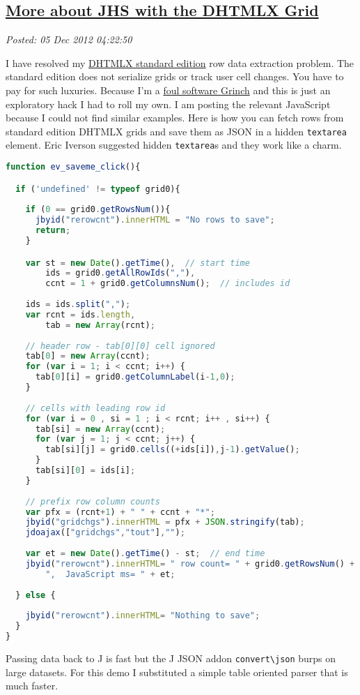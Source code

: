 %

\subsection*{\href{https://bakerjd99.wordpress.com/2012/12/04/more-about-jhs-with-dhtmlx-the-grid/}{More about JHS with the DHTMLX Grid}}


\noindent\emph{Posted: 05 Dec 2012 04:22:50}
\vspace{6pt}

I have resolved my \href{http://dhtmlx.com/docs/download.shtml}{DHTMLX
standard edition} row data extraction problem. The standard edition does
not serialize grids or track user cell changes. You have to pay for such
luxuries. Because I'm a
\href{http://www.youtube.com/watch?v=ZgP0aUKlmNw}{foul software Grinch}
and this is just an exploratory hack I had to roll my own. I am posting
the relevant JavaScript because I could not find similar examples. Here
is how you can fetch rows from standard edition DHTMLX grids and save
them as JSON in a hidden \texttt{textarea} element. Eric Iverson
suggested hidden \texttt{textarea}s and they work like a charm.


\begin{lstlisting}[language=JavaScript,frame=single,framerule=0pt,label=lst:scr3516X0]
function ev_saveme_click(){

  if ('undefined' != typeof grid0){
  
    if (0 == grid0.getRowsNum()){
      jbyid("rerowcnt").innerHTML = "No rows to save"; 
      return;
    }

    var st = new Date().getTime(),  // start time  
        ids = grid0.getAllRowIds(","),
        ccnt = 1 + grid0.getColumnsNum();  // includes id
      
    ids = ids.split(",");  
    var rcnt = ids.length,
        tab = new Array(rcnt);
    
    // header row - tab[0][0] cell ignored
    tab[0] = new Array(ccnt);  
    for (var i = 1; i < ccnt; i++) {
      tab[0][i] = grid0.getColumnLabel(i-1,0); 
    }
     
    // cells with leading row id
    for (var i = 0 , si = 1 ; i < rcnt; i++ , si++) {
      tab[si] = new Array(ccnt);
      for (var j = 1; j < ccnt; j++) {
        tab[si][j] = grid0.cells((+ids[i]),j-1).getValue();
      }
      tab[si][0] = ids[i];
    }
  
    // prefix row column counts 
    var pfx = (rcnt+1) + " " + ccnt + "*";
    jbyid("gridchgs").innerHTML = pfx + JSON.stringify(tab);
    jdoajax(["gridchgs","tout"],"");
  
    var et = new Date().getTime() - st;  // end time    
    jbyid("rerowcnt").innerHTML= " row count= " + grid0.getRowsNum() +  
        ",  JavaScript ms= " + et; 
        
  } else {
  
    jbyid("rerowcnt").innerHTML= "Nothing to save";     
  }
}
\end{lstlisting}

Passing data back to J is fast but the J JSON addon
\texttt{convert\textbackslash{}json} burps on large datasets. For this
demo I substituted a simple table oriented parser that is much faster.



%